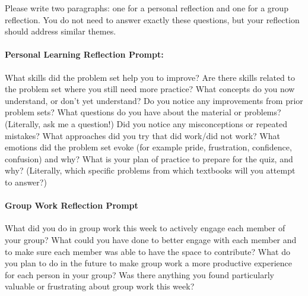 \documentclass[12pt]{article}
\begin{document}

{}%




\vspace{1cm}
Please write two paragraphs: one for a personal reflection and one for a group reflection. You do not need to answer exactly these questions, but your reflection should address similar themes.

\paragraph{Personal Learning Reflection Prompt:}
What skills did the problem set help you to improve? Are there skills related to the problem set where you still need more practice? What concepts do you now understand, or don't yet understand? Do you notice any improvements from prior problem sets? What questions do you have about the material or problems? (Literally, ask me a question!) Did you notice any misconceptions or repeated mistakes? What approaches did you try that did work/did not work? What emotions did the problem set evoke (for example pride, frustration, confidence, confusion) and why? What is your plan of practice to prepare for the quiz, and why? (Literally, which specific problems from which textbooks will you attempt to answer?) 

\paragraph{Group Work Reflection Prompt} What did you do in group work this week to actively engage each member of your group? What could you have done to better engage with each member and to make sure each member was able to have the space to contribute? What do you plan to do in the future to make group work a more productive experience for each person in your group? Was there anything you found particularly valuable or frustrating about group work this week?
\end{document}

